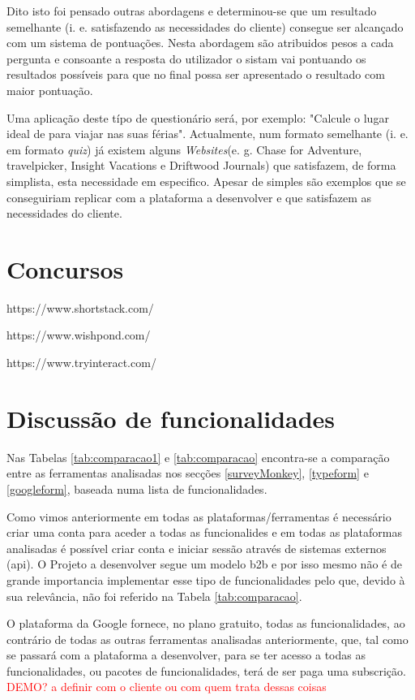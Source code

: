 Dito isto foi pensado outras abordagens e determinou-se que um resultado semelhante (i. e. satisfazendo as necessidades do cliente) consegue ser alcançado com um sistema de pontuações. Nesta abordagem são atribuidos pesos a cada pergunta e consoante a resposta do utilizador o sistam vai pontuando os resultados possíveis para que no final possa ser apresentado o resultado com maior pontuação.

Uma aplicação deste típo de questionário será, por exemplo: "Calcule o lugar ideal de para viajar nas suas férias". Actualmente, num formato semelhante (i. e. em formato \textit{quiz}) já existem alguns \textit{Websites}(e. g. Chase for Adventure\cite{chaseforadventure}, travelpicker\cite{travelpicker}, Insight Vacations\cite{insightvacations} e Driftwood Journals\cite{driftwoodjournals}) que satisfazem, de forma simplista, esta necessidade em especifico. Apesar de simples são exemplos que se conseguiriam replicar com a plataforma a desenvolver e que satisfazem as necessidades do cliente. 

\section{Concursos}
https://www.shortstack.com/

https://www.wishpond.com/

https://www.tryinteract.com/

\section{Discussão de funcionalidades}
\label{comparacao}

Nas Tabelas \ref{tab:comparacao1} e \ref{tab:comparacao} encontra-se a comparação entre as ferramentas analisadas nos secções \ref{surveyMonkey}, \ref{typeform} e \ref{googleform}, baseada numa lista de funcionalidades.

Como vimos anteriormente em todas as plataformas/ferramentas é necessário criar uma conta para aceder a todas as funcionalides e em todas as plataformas analisadas é possível criar conta e iniciar sessão através de sistemas externos (\acrshort{api}). O Projeto a desenvolver segue um modelo \gls{b2b} e por isso mesmo não é de grande importancia implementar esse tipo de funcionalidades pelo que, devido à sua relevância, não foi referido na Tabela \ref{tab:comparacao}.

O plataforma da Google fornece, no plano gratuito, todas as funcionalidades, ao contrário de todas as outras ferramentas analisadas anteriormente, que, tal como se passará com a plataforma a desenvolver, para se ter acesso a todas as funcionalidades, ou pacotes de funcionalidades, terá de ser paga uma subscrição. \textcolor{red}{DEMO? a definir com o cliente ou com quem trata dessas coisas}

